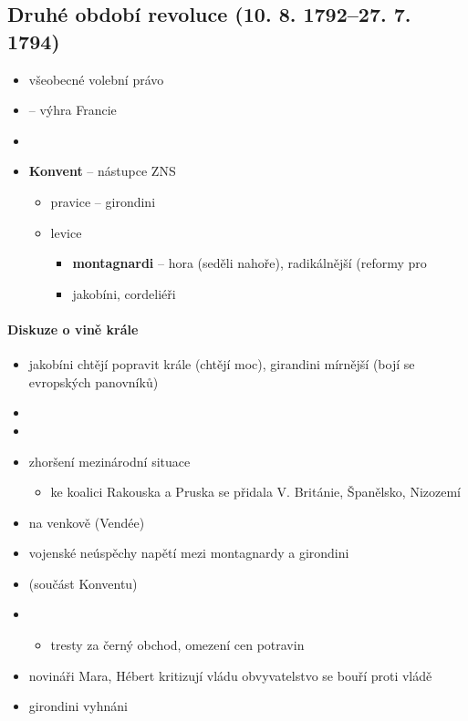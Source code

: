 \subsection{Druhé období revoluce (10. 8. 1792--27. 7. 1794)}
\begin{itemize}
\item všeobecné volební právo
\item {} -- výhra Francie
\item {}
\item \textbf{Konvent} -- nástupce ZNS
	\begin{itemize}
	\item pravice -- girondini
	\item levice 
		\begin{itemize}
		\item \textbf{montagnardi} -- hora (seděli nahoře), radikálnější (reformy pro
		\item jakobíni, cordeliéři
		\end{itemize}
	\end{itemize}
\end{itemize}

\paragraph{Diskuze o vině krále}
\begin{itemize}
\item jakobíni chtějí popravit krále (chtějí moc), girandini mírnější (bojí se evropských panovníků)
\item {}
\item {}
\item[\ra] zhoršení mezinárodní situace
	\begin{itemize}
	\item ke koalici Rakouska a Pruska se přidala V. Británie, Španělsko, Nizozemí
	\end{itemize}
\item {} na venkově (Vendée)
\item vojenské neúspěchy \ra napětí mezi montagnardy a girondini
\item {} (součást Konventu)
\item {}
	\begin{itemize}
	\item tresty za černý obchod, omezení cen potravin
	\end{itemize}
\item novináři Mara, Hébert \ra kritizují vládu \ra obvyvatelstvo se bouří proti vládě
\item {} \ra girondini vyhnáni
\end{itemize}

